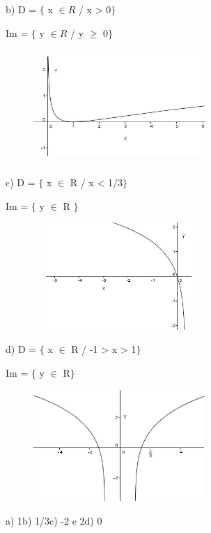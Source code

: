 \begin{respostas}{7}
\begin{multicols}{2}
b)
D = $ \{ $  x  \(  \in R \)  / x > 0$ \} $ 

Im = $ \{ $  y  \(  \in R \)  / y $ \geq $  0$ \} $ 

\begin{figure}[H]
	\begin{Center}
		\includegraphics[width=2.57in,height=1.69in]{capitulos/logaritmos_e_funcao_logaritmica/media/image35.JPG}
	\end{Center}
\end{figure}

c)
D = $ \{ $ x $ \in $ R / x < 1/3$ \} $ 

Im = $ \{ $  y $ \in $ R $ \} $ 

\begin{figure}[H]
	\begin{Center}
		\includegraphics[width=2.55in,height=1.6in]{capitulos/logaritmos_e_funcao_logaritmica/media/image36.JPG}
	\end{Center}
\end{figure}

d)
D = $ \{ $  x $ \in $ R / -1 > x > 1$ \} $

Im = $ \{ $  y $ \in $ R$ \} $

\begin{figure}[H]
	\begin{Center}
		\includegraphics[width=2.55in,height=1.66in]{capitulos/logaritmos_e_funcao_logaritmica/media/image37.JPG}
	\end{Center}
\end{figure}

\ansitem{}  a) 1\quad \quad b) 1/3\quad \quad c) -2 e 2\quad \quad d) 0
\end{multicols}
\end{respostas}

